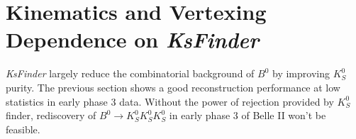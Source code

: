 \section{Kinematics and Vertexing Dependence on \textit{KsFinder}} 

\textit{KsFinder} largely reduce the combinatorial background of $B^0$ by improving $K_S^0$ purity. The previous section shows a good reconstruction performance at low statistics in early phase 3 data. Without the power of rejection provided by $K_S^0$ finder, rediscovery of $B^0 \to K_S^0  K_S^0  K_S^0$ in early phase 3 of Belle II won't be feasible. 

